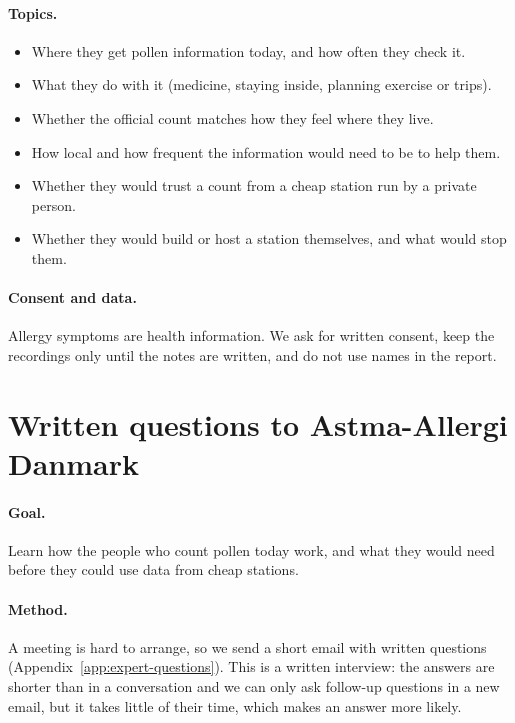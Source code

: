 \paragraph{Topics.}
\begin{itemize}
  \item Where they get pollen information today, and how often they check it.
  \item What they do with it (medicine, staying inside, planning exercise or trips).
  \item Whether the official count matches how they feel where they live.
  \item How local and how frequent the information would need to be to help them.
  \item Whether they would trust a count from a cheap station run by a private person.
  \item Whether they would build or host a station themselves, and what would stop them.
\end{itemize}

\paragraph{Consent and data.} Allergy symptoms are health information. We ask for written
consent, keep the recordings only until the notes are written, and do not use names in the
report. 

\section{Written questions to Astma-Allergi Danmark}\label{sec:expert-email}


\paragraph{Goal.} Learn how the people who count pollen today work, and what they would need
before they could use data from cheap stations.

\paragraph{Method.} A meeting is hard to arrange, so we send a short email with written
questions (Appendix~\ref{app:expert-questions}). This is a written interview: the answers are
shorter than in a conversation and we can only ask follow-up questions in a new email, but it
takes little of their time, which makes an answer more likely.

